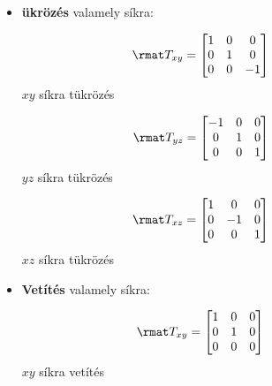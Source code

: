 \documentclass[a4paper, 12pt]{scrartcl}
\begin{document}
\begin{blueBox}
\begin{itemize}
\begin{multicols}{3}
            $$
              \rmat T_z = \begin{bmatrix}
                0 & 0 & 0 \\
                0 & 0 & 0 \\
                0 & 0 & 1
              \end{bmatrix}
              \phantom{= \rmat T_z}
            $$
            $z$-tengelyre tükrözés
          \end{multicols}

    \item \textbf{ükrözés} valamely síkra:
          \vspace{-10mm}
          \begin{multicols}{3}
            $$
              \rmat T_{xy} = \begin{bmatrix}
                1 & 0 & 0  \\
                0 & 1 & 0  \\
                0 & 0 & -1
              \end{bmatrix}
              \phantom{= \rmat T_{xy}}
            $$
            $xy$ síkra tükrözés

            $$
              \rmat T_{yz} = \begin{bmatrix}
                -1 & 0 & 0 \\
                0  & 1 & 0 \\
                0  & 0 & 1
              \end{bmatrix}
              \phantom{= \rmat T_{yz}}
            $$
            $yz$ síkra tükrözés

            $$
              \rmat T_{xz} = \begin{bmatrix}
                1 & 0  & 0 \\
                0 & -1 & 0 \\
                0 & 0  & 1
              \end{bmatrix}
              \phantom{= \rmat T_{xz}}
            $$
            $xz$ síkra tükrözés
          \end{multicols}

    \item \textbf{Vetítés} valamely síkra:
          \vspace{-10mm}
          \begin{multicols}{3}
            $$
              \rmat T_{xy} = \begin{bmatrix}
                1 & 0 & 0 \\
                0 & 1 & 0 \\
                0 & 0 & 0
              \end{bmatrix}
              \phantom{= \rmat T_{xy}}
            $$
            $xy$ síkra vetítés


\end{multicols}
\end{itemize}
\end{blueBox}
\end{document}
